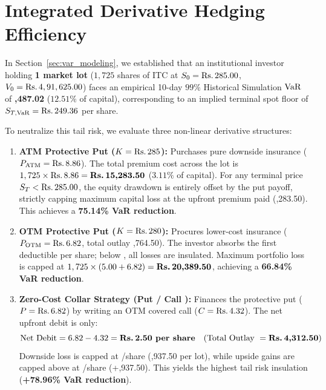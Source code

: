 
\section{Integrated Derivative Hedging Efficiency}
\label{sec:hedging}

In Section~\ref{sec:var_modeling}, we established that an institutional investor holding \textbf{1 market lot} ($1,725$ shares of ITC at $S_0 = \text{\text{Rs.}\,}285.00$, $V_0 = \text{\text{Rs.}\,}4,91,625.00$) faces an empirical 10-day $99\%$ Historical Simulation $\operatorname{VaR}$ of \textbf{,487.02} ($12.51\%$ of capital), corresponding to an implied terminal spot floor of $S_{T, \operatorname{VaR}} = \text{\text{Rs.}\,}249.36$ per share.

To neutralize this tail risk, we evaluate three non-linear derivative structures:
\begin{enumerate}[leftmargin=1.8em, noitemsep]
    \item \textbf{ATM Protective Put ($K = \text{\text{Rs.}\,}285$):} Purchases pure downside insurance ($P_{\text{ATM}} = \text{\text{Rs.}\,}8.86$). The total premium cost across the lot is $1,725 \times \text{\text{Rs.}\,}8.86 = \text{\textbf{\text{Rs.}\,15,283.50}}$ ($3.11\%$ of capital). For any terminal price $S_T < \text{\text{Rs.}\,}285.00$, the equity drawdown is entirely offset by the put payoff, strictly capping maximum capital loss at the upfront premium paid (,283.50). This achieves a \textbf{75.14\% VaR reduction}.
    \item \textbf{OTM Protective Put ($K = \text{\text{Rs.}\,}280$):} Procures lower-cost insurance ($P_{\text{OTM}} = \text{\text{Rs.}\,}6.82$, total outlay ,764.50). The investor absorbs the first  deductible per share; below , all losses are insulated. Maximum portfolio loss is capped at $1,725 \times (5.00 + 6.82) = \text{\textbf{\text{Rs.}\,20,389.50}}$, achieving a \textbf{66.84\% VaR reduction}.
    \item \textbf{Zero-Cost Collar Strategy (Put  / Call ):} Finances the protective  put ($P = \text{\text{Rs.}\,}6.82$) by writing an OTM  covered call ($C = \text{\text{Rs.}\,}4.32$). The net upfront debit is only:
    \begin{equation}
    \text{Net Debit} = 6.82 - 4.32 = \text{\textbf{\text{Rs.}\,2.50 per share}} \quad (\text{Total Outlay } = \text{\textbf{\text{Rs.}\,4,312.50}})
    \end{equation}
    Downside loss is capped at /share (,937.50 per lot), while upside gains are capped above  at /share (+,937.50). This yields the highest tail risk insulation (\textbf{+78.96\% VaR reduction}).
\end{enumerate}

